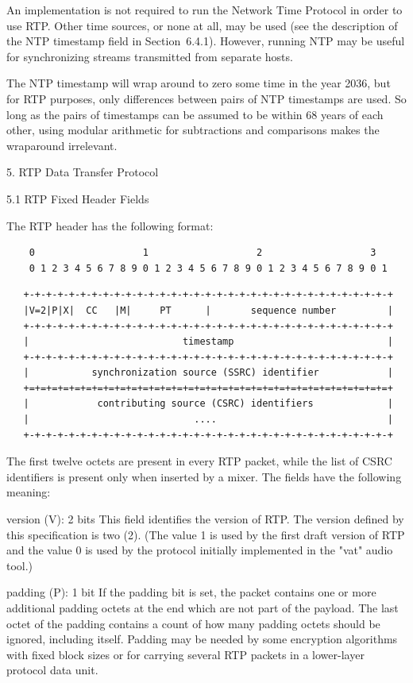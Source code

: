 \documentclass{article}
\begin{document}
An implementation is not required to run the Network Time Protocol in order to use RTP.  Other time sources, or none at all, may be used (see the description of the NTP timestamp field in Section~6.4.1). However, running NTP may be useful for synchronizing streams transmitted from separate hosts.

The NTP timestamp will wrap around to zero some time in the year 2036, but for RTP purposes, only differences between pairs of NTP timestamps are used.  So long as the pairs of timestamps can be assumed to be within 68 years of each other, using modular arithmetic for subtractions and comparisons makes the wraparound irrelevant.

5. RTP Data Transfer Protocol

5.1 RTP Fixed Header Fields

The RTP header has the following format:

\begin{verbatim}
    0                   1                   2                   3
    0 1 2 3 4 5 6 7 8 9 0 1 2 3 4 5 6 7 8 9 0 1 2 3 4 5 6 7 8 9 0 1
\end{verbatim}

\begin{verbatim}
   +-+-+-+-+-+-+-+-+-+-+-+-+-+-+-+-+-+-+-+-+-+-+-+-+-+-+-+-+-+-+-+-+
   |V=2|P|X|  CC   |M|     PT      |       sequence number         |
   +-+-+-+-+-+-+-+-+-+-+-+-+-+-+-+-+-+-+-+-+-+-+-+-+-+-+-+-+-+-+-+-+
   |                           timestamp                           |
   +-+-+-+-+-+-+-+-+-+-+-+-+-+-+-+-+-+-+-+-+-+-+-+-+-+-+-+-+-+-+-+-+
   |           synchronization source (SSRC) identifier            |
   +=+=+=+=+=+=+=+=+=+=+=+=+=+=+=+=+=+=+=+=+=+=+=+=+=+=+=+=+=+=+=+=+
   |            contributing source (CSRC) identifiers             |
   |                             ....                              |
   +-+-+-+-+-+-+-+-+-+-+-+-+-+-+-+-+-+-+-+-+-+-+-+-+-+-+-+-+-+-+-+-+
\end{verbatim}

The first twelve octets are present in every RTP packet, while the list of CSRC identifiers is present only when inserted by a mixer. The fields have the following meaning:

version (V): 2 bits This field identifies the version of RTP.  The version defined by this specification is two (2).  (The value 1 is used by the first draft version of RTP and the value 0 is used by the protocol initially implemented in the "vat" audio tool.)

padding (P): 1 bit If the padding bit is set, the packet contains one or more additional padding octets at the end which are not part of the payload.  The last octet of the padding contains a count of how many padding octets should be ignored, including itself.  Padding may be needed by some encryption algorithms with fixed block sizes or for carrying several RTP packets in a lower-layer protocol data unit.
\end{document}
